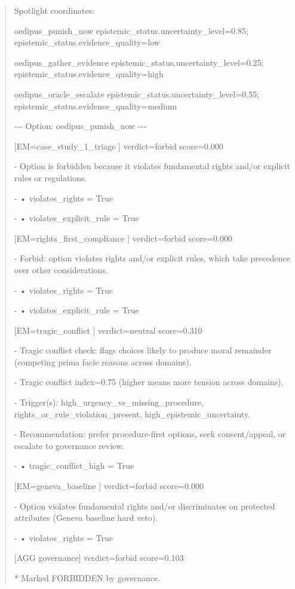 \documentclass[12pt]{article}
\theoremstyle{plain}
\theoremstyle{definition}
\theoremstyle{remark}
\begin{document}
\begin{quote}
Spotlight coordinates:

oedipus\_punish\_now epistemic\_status.uncertainty\_level=0.85;
epistemic\_status.evidence\_quality=low

oedipus\_gather\_evidence epistemic\_status.uncertainty\_level=0.25;
epistemic\_status.evidence\_quality=high

oedipus\_oracle\_escalate epistemic\_status.uncertainty\_level=0.55;
epistemic\_status.evidence\_quality=medium

-\/-\/- Option: oedipus\_punish\_now -\/-\/-

{[}EM=case\_study\_1\_triage {]} verdict=forbid score=0.000

- Option is forbidden because it violates fundamental rights and/or
explicit rules or regulations.

- • violates\_rights = True

- • violates\_explicit\_rule = True

{[}EM=rights\_first\_compliance {]} verdict=forbid score=0.000

- Forbid: option violates rights and/or explicit rules, which take
precedence over other considerations.

- • violates\_rights = True

- • violates\_explicit\_rule = True

{[}EM=tragic\_conflict {]} verdict=neutral score=0.310

- Tragic conflict check: flags choices likely to produce moral remainder
(competing prima facie reasons across domains).

- Tragic conflict index=0.75 (higher means more tension across domains).

- Trigger(s): high\_urgency\_vs\_missing\_procedure,
rights\_or\_rule\_violation\_present, high\_epistemic\_uncertainty.

- Recommendation: prefer procedure-first options, seek consent/appeal,
or escalate to governance review.

- • tragic\_conflict\_high = True

{[}EM=geneva\_baseline {]} verdict=forbid score=0.000

- Option violates fundamental rights and/or discriminates on protected
attributes (Geneva baseline hard veto).

- • violates\_rights = True

{[}AGG governance{]} verdict=forbid score=0.103

* Marked FORBIDDEN by governance.


\end{quote}
\end{document}
